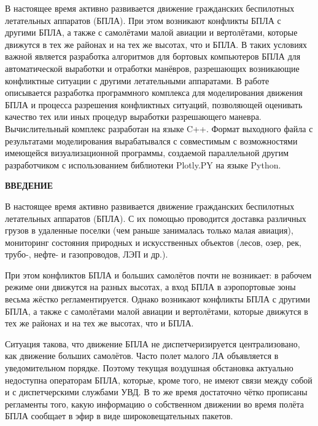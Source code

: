 \documentclass[a4paper,12pt]{article}
\newcounter{def}
\numberwithin{figure}{subsubsection}
\begin{document}
\bigskip

В настоящее время активно развивается движение гражданских беспилотных летательных аппаратов (БПЛА). При этом возникают конфликты БПЛА с другими БПЛА, а также с самолётами малой авиации и вертолётами, которые движутся в тех же районах и на тех же высотах, что и БПЛА. В таких условиях важной является разработка алгоритмов для бортовых компьютеров БПЛА для автоматической выработки и отработки манёвров, разрешающих возникающие конфликтные ситуации с другими летательными аппаратами. В работе описывается разработка программного комплекса для моделирования движения БПЛА и процесса разрешения конфликтных ситуаций, позволяющей оценивать качество тех или иных процедур выработки разрешающего маневра. Вычислительный комплекс разработан на языке C++. Формат выходного файла с результатами моделирования вырабатывался с совместимым с возможностями имеющейся визуализационной программы, создаемой параллельной другим разработчиком с использованием библиотеки Plotly.PY на языке Python. 
  

\newpage
\setcounter{page}{2}
\def\contentsname{\centerline{\large СОДЕРЖАНИЕ}}
\tableofcontents
\newpage

\newpage
\centerline{\textbf{\large ВВЕДЕНИЕ}}

\bigskip
В настоящее время активно развивается движение гражданских беспилотных летательных аппаратов (БПЛА). С их помощью проводится доставка различных грузов в удаленные поселки (чем раньше занималась только малая авиация), мониторинг состояния природных и искусственных объектов (лесов, озер, рек, трубо-, нефте- и газопроводов, ЛЭП и др.).

При этом конфликтов БПЛА и больших самолётов почти не возникает: в рабочем режиме они движутся на разных высотах, а вход БПЛА в аэропортовые зоны весьма жёстко регламентируется. Однако возникают конфликты БПЛА  с другими БПЛА, а также с самолётами малой авиации и вертолётами, которые движутся в тех же районах и на тех же высотах, что и БПЛА. 

Ситуация такова, что движение БПЛА не диспетчеризируется централизовано, как движение больших самолётов. Часто полет малого ЛА объявляется в уведомительном порядке. Поэтому текущая воздушная обстановка актуально недоступна операторам БПЛА, которые, кроме того, не имеют связи между собой и с диспетчерскими службами УВД. В то же время достаточно чётко прописаны регламенты того, какую информацию о собственном движении во время полёта БПЛА сообщает в эфир в виде широковещательных пакетов.
\end{document}
